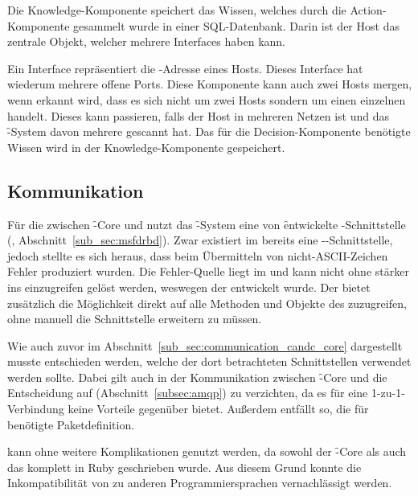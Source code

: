 Die Knowledge-Komponente speichert das Wissen, welches durch die Action-Komponente
gesammelt wurde in einer SQL-Datenbank.  Darin ist der Host das zentrale Objekt,
welcher mehrere Interfaces haben kann.

Ein Interface repräsentiert die -Adresse eines Hosts.  Dieses
Interface hat wiederum mehrere offene Ports.  Diese Komponente kann
auch zwei Hosts mergen, wenn erkannt wird, dass es sich nicht um zwei
Hosts sondern um einen einzelnen handelt.  Dieses kann passieren,
falls der Host in mehreren Netzen ist und das \f-System davon mehrere
gescannt hat.  Das für die Decision-Komponente benötigte Wissen wird
in der Knowledge-Komponente gespeichert.

\subsection{Kommunikation}
\label{subsec:core:communication}

Für die  zwischen \f-Core und  nutzt das \f-System eine
von \f entwickelte -Schnittstelle (,
Abschnitt~\ref{sub_sec:msfdrbd}). Zwar existiert im  bereits eine
--Schnittstelle, jedoch stellte
es sich heraus, dass beim Übermitteln von nicht-ASCII-Zeichen
Fehler produziert wurden. Die Fehler-Quelle liegt im  und
kann nicht ohne stärker ins  einzugreifen gelöst werden,
weswegen der  entwickelt wurde. Der  bietet
zusätzlich die Möglichkeit direkt auf alle Methoden und Objekte des
 zuzugreifen, ohne manuell die Schnittstelle erweitern zu
müssen.

Wie auch zuvor im Abschnitt~\ref{sub_sec:communication_candc_core}
dargestellt musste entschieden werden, welche der dort betrachteten
Schnittstellen verwendet werden sollte. Dabei gilt auch in der
Kommunikation zwischen \f-Core und  die Entscheidung auf
 (Abschnitt~\ref{subsec:amqp}) zu verzichten, da es für eine
1-zu-1-Verbindung keine Vorteile gegenüber  bietet. Außerdem
entfällt so, die für  benötigte Paketdefinition.

 kann ohne weitere Komplikationen genutzt werden, da sowohl der
\f-Core als auch das  komplett in Ruby geschrieben wurde. Aus diesem
Grund konnte die Inkompatibilität von  zu anderen Programmiersprachen
vernachlässigt werden.

